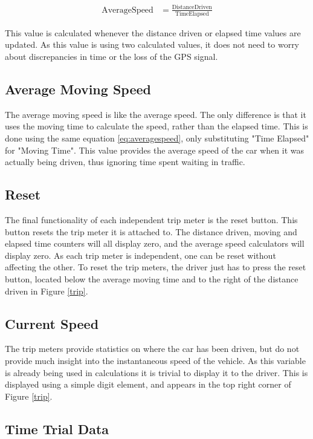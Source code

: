 \begin{align}
\label{eq:averagespeed}
\mathrm{Average Speed} &=\frac{\mathrm{Distance Driven}}{\mathrm{Time Elapsed}}
\end{align}

This value is calculated whenever the distance driven or elapsed time values are updated. As this value is using two calculated values, it does not need to worry about discrepancies in time or the loss of the GPS signal.

\subsection{Average Moving Speed}

The average moving speed is like the average speed. The only difference is that it uses the moving time to calculate the speed, rather than the elapsed time. This is done using the same equation \ref{eq:averagespeed}, only substituting "Time Elapsed" for "Moving Time". This value provides the average speed of the car when it was actually being driven, thus ignoring time spent waiting in traffic.

\subsection{Reset}

The final functionality of each independent trip meter is the reset button. This button resets the trip meter it is attached to. The distance driven, moving and elapsed time counters will all display zero, and the average speed calculators will display zero. As each trip meter is independent, one can be reset without affecting the other. To reset the trip meters, the driver just has to press the reset button, located below the average moving time and to the right of the distance driven in Figure \ref{trip}.

\subsection{Current Speed}

The trip meters provide statistics on where the car has been driven, but do not provide much insight into the instantaneous speed of the vehicle. As this variable is already being used in calculations it is trivial to display it to the driver. This is displayed using a simple digit element, and appears in the top right corner of Figure \ref{trip}.

\subsection{Time Trial Data}


